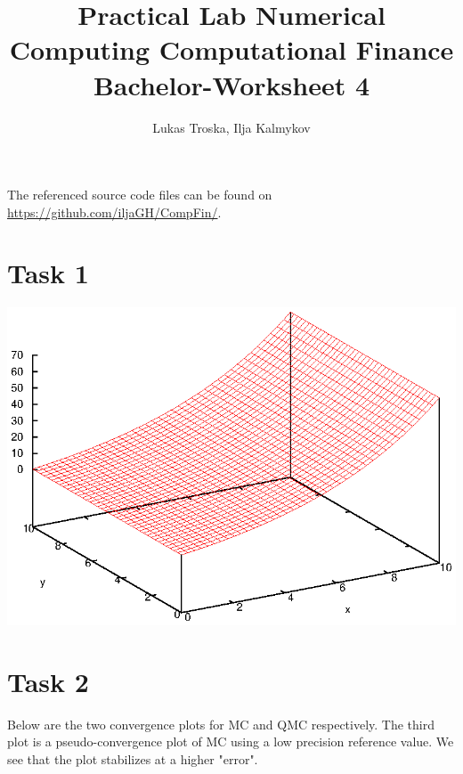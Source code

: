 \documentclass[]{article}
\title{Practical Lab Numerical Computing Computational Finance \\Bachelor-Worksheet 4}
\author{Lukas Troska, Ilja Kalmykov}
\date{}
\begin{document}
\maketitle

The referenced source code files can be found on
\url{https://github.com/iljaGH/CompFin/}.

\section*{Task 1}
\includegraphics[width=.9\textwidth]{task1.eps}\\

\section*{Task 2}
Below are the two convergence plots for MC and QMC respectively. The third plot is a pseudo-convergence plot of MC using a low precision reference value. We see that the plot stabilizes at a higher "error".
\end{document}
